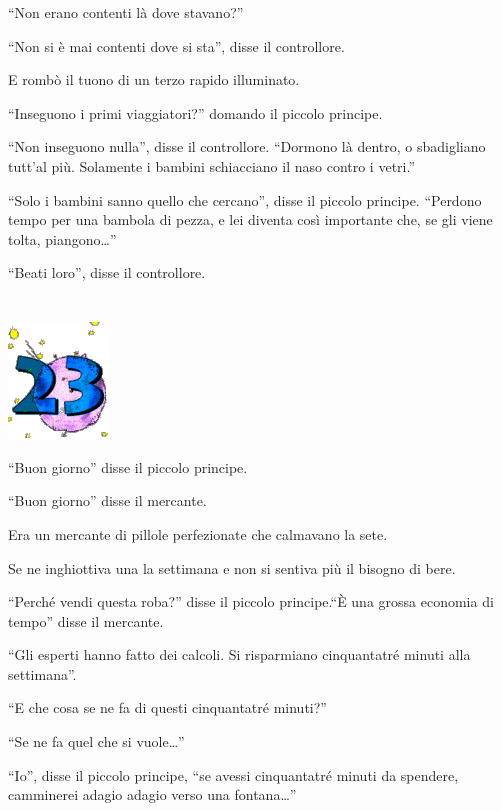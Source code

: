 \documentclass[11pt]{scrbook}
\begin{document}
``Non erano contenti là dove stavano?''

``Non si è mai contenti dove si sta'', disse il controllore.

E rombò il tuono di un terzo rapido illuminato.

``Inseguono i primi viaggiatori?'' domando il piccolo principe.

``Non inseguono nulla'', disse il controllore. ``Dormono là dentro, o sbadigliano tutt'al più. Solamente i bambini schiacciano il naso contro i vetri.''

``Solo i bambini sanno quello che cercano'', disse il piccolo principe. ``Perdono tempo per una bambola di pezza, e lei diventa così importante che, se gli viene tolta, piangono\ldots{}''

``Beati loro'', disse il controllore.

\chapter{}
\begin{center}
\includegraphics{img/chapter23}
\end{center}

``Buon giorno'' disse il piccolo principe.

``Buon giorno'' disse il mercante.

Era un mercante di pillole perfezionate che calmavano la sete.

Se ne inghiottiva una la settimana e non si sentiva più il bisogno di bere.

``Perché vendi questa roba?'' disse il piccolo principe.``È una grossa economia di tempo'' disse il mercante.

``Gli esperti hanno fatto dei calcoli. Si risparmiano cinquantatré minuti alla settimana''.

``E che cosa se ne fa di questi cinquantatré minuti?''

``Se ne fa quel che si vuole\ldots{}''

``Io'', disse il piccolo principe, ``se avessi cinquantatré minuti da spendere, camminerei adagio adagio verso una fontana\ldots{}''
\end{document}
